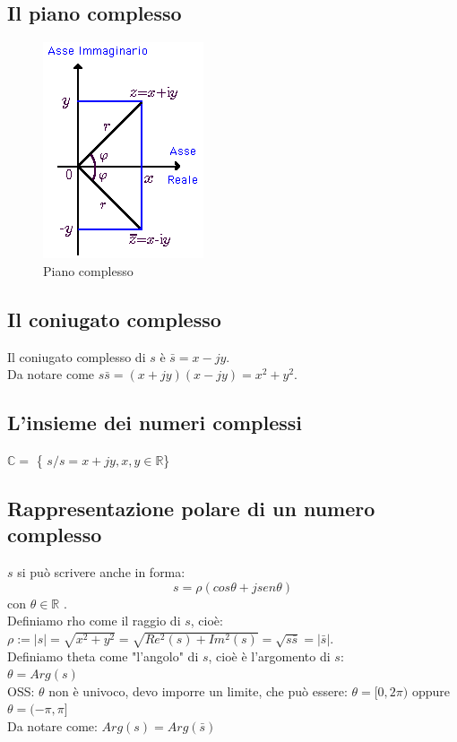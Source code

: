 \subsection*{Il piano complesso}

\begin{figure}[h]
	\centering
	\includegraphics[scale=1.2]{immagini/pianoComplesso}
	\caption{ Piano complesso }
	\label{fig: piano complesso}
\end{figure}

\subsection*{Il coniugato complesso}
Il coniugato complesso di $s$ è $ \bar{s} = x -jy $.\\
Da notare come $s\bar{s} = (x+jy)(x-jy) = x^{2}+y^{2}$.\\

\subsection*{L'insieme dei numeri complessi}
$\mathbb{C} =$ \{ $s / s = x+jy, x,y \in \mathbb{R} $\} 

\subsection*{Rappresentazione polare di un numero complesso}

$s$ si può scrivere anche in forma:
\begin{equation*}
 s = \rho (cos\theta + j sen\theta)
\end{equation*}
con $\theta \in \mathbb{R}$ .\\
Definiamo rho come il raggio di $s$, cioè: \\
$\rho := |s| = \sqrt{x^{2}+y^{2}} = \sqrt{ Re^{2}(s)+Im^{2}(s)} = \sqrt{s\bar{s}} = |\bar{s}|$.\\
Definiamo theta come "l'angolo" di $s$, cioè è l'argomento di $s$: \\
$ \theta = Arg(s)$ \\
OSS: $\theta$ non è univoco, devo imporre un limite, che può essere:
$\theta = [0,2\pi)$ oppure $\theta = (-\pi, \pi] $ \\
Da notare come: $Arg(s) = Arg(\bar{s})$


